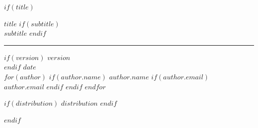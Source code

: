\documentclass[
    $if(fontsize)$$fontsize$$else$10pt$endif$,
    $if(papersize)$$papersize$$else$letterpaper$endif$,
    titlepage,
    oneside,
    openright,
    $if(draft)$draft$else$final$endif$,
    article]{memoir}
\begin{document}
%
$if(title)$
    \ifpdf
    \fi
    \newlength{\centeroffset}
    \thispagestyle{empty}
    \vspace*{1.5in}
    \begin{flushleft}
        {
            {\fontsize{20pt}{24pt}$title$}
            $if(subtitle)$
                {\\\fontsize{18pt}{21.6pt}$subtitle$}
            $endif$
        }
        \noindent\rule[-1.2pt]{\textwidth}{.1pt}

        $if(version)$
            {\fontsize{12pt}{14.4pt}
                \space $version$\\[0.05in]
            }
        $endif$
        {\fontsize{12pt}{14.4pt}$date$}\\[0.05in]


        \vspace*{2.5in}
        $for(author)$
            $if(author.name)$
                {\fontsize{12pt}{14.4pt}$author.name$}
                $if(author.email)$
                    {\\[0.05in]\fontsize{12pt}{14.4pt}$author.email$}
                $endif$
            $endif$
        $endfor$

        \vspace*{\fill}
        $if(distribution)$
            {\fontsize{11pt}{13.2pt}$distribution$}
        $endif$
    \end{flushleft}
$endif$

\frontmatter

\end{document}

